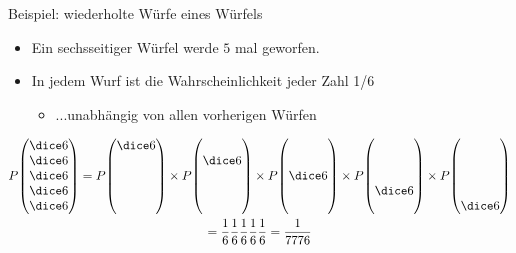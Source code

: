 \begin{frame}{Beispiel: wiederholte Würfe eines Würfels}
  \begin{itemize}
  \item Ein sechsseitiger Würfel werde $5$ mal geworfen.
  \item In jedem Wurf ist die Wahrscheinlichkeit jeder Zahl 1/6
    \begin{itemize}
    \item ...unabhängig von allen vorherigen Würfen
    \end{itemize}
  \end{itemize}
  \begin{multline*}
    P\!\left(
      \begin{matrix}
        \dice6\\\dice6\\\dice6\\\dice6\\\dice6
      \end{matrix}
    \right)
    =
    P\!\left(
      \begin{matrix}
        \dice6\\ \\ \\ \\\phantom{\dice6}
      \end{matrix}
    \right)\times
    P\!\left(
      \begin{matrix}
        \\\dice6 \\ \\ \\\phantom{\dice6}
      \end{matrix}
    \right)\times
    P\!\left(
      \begin{matrix}
        \\ \\\dice6 \\ \\\phantom{\dice6}
      \end{matrix}
    \right)\times
    P\!\left(
      \begin{matrix}
        \\ \\ \\\dice6 \\\phantom{\dice6}
      \end{matrix}
    \right)\times
    P\!\left(
      \begin{matrix}
        \\ \\ \\ \\\dice6
      \end{matrix}
    \right)\\
    =\frac16\frac16\frac16\frac16\frac16 = \frac1{7776}
  \end{multline*}
\end{frame}


